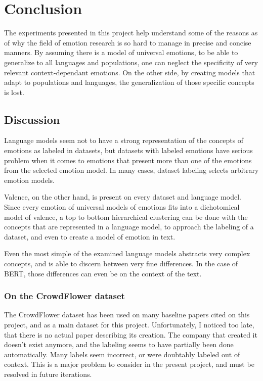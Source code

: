 \chapter{Conclusion}\label{chap:Conclusion}
The experiments presented in this project help understand some of the reasons as of why the field of emotion research is so hard to manage in precise and concise manners. By assuming there is a model of universal emotions, to be able to generalize to all languages and populations, one can neglect the specificity of very relevant context-dependant emotions. On the other side, by creating models that adapt to populations and languages, the generalization of those specific concepts is lost.

\section{Discussion}\label{sec:Discussion}
Language models seem not to have a strong representation of the concepts of emotions as labeled in datasets, but datasets with labeled emotions have serious problem when it comes to emotions that present more than one of the emotions from the selected emotion model. In many cases, dataset labeling selects arbitrary emotion models.

Valence, on the other hand, is present on every dataset and language model. Since every emotion of universal models of emotions fits into a dichotomical model of valence, a top to bottom hierarchical clustering can be done with the concepts that are represented in a language model, to approach the labeling of a dataset, and even to create a model of emotion in text.

Even the most simple of the examined language models abstracts very complex concepts, and is able to discern between very fine differences. In the case of BERT, those differences can even be on the context of the text.

\subsection{On the CrowdFlower dataset}
The CrowdFlower dataset has been used on many baseline papers cited on this project, and as a main dataset for this project. Unfortunately, I noticed too late, that there is no actual paper describing its creation. The company that created it doesn't exist anymore, and the labeling seems to have partially been done automatically. Many labels seem incorrect, or were doubtably labeled out of context. This is a major problem to consider in the present project, and must be resolved in future iterations.

